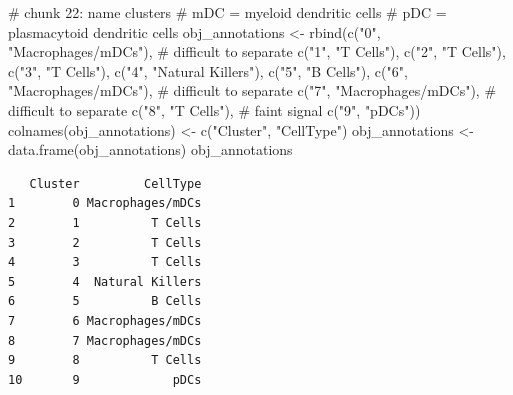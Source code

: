 \documentclass[
  letterpaper,
  DIV=11,
  numbers=noendperiod]{scrartcl}
\newenvironment{Shaded}{\begin{snugshade}}{\end{snugshade}}
\newcommand{\CommentTok}[1]{\textcolor[rgb]{0.37,0.37,0.37}{#1}}
\newcommand{\FunctionTok}[1]{\textcolor[rgb]{0.28,0.35,0.67}{#1}}
\newcommand{\NormalTok}[1]{\textcolor[rgb]{0.00,0.23,0.31}{#1}}
\newcommand{\OtherTok}[1]{\textcolor[rgb]{0.00,0.23,0.31}{#1}}
\newcommand{\StringTok}[1]{\textcolor[rgb]{0.13,0.47,0.30}{#1}}
\begin{document}
\begin{Shaded}
\begin{Highlighting}[]
\CommentTok{\# chunk 22: name clusters }
\CommentTok{\# mDC = myeloid dendritic cells}
\CommentTok{\# pDC = plasmacytoid dendritic cells}
\NormalTok{obj\_annotations }\OtherTok{\textless{}{-}} \FunctionTok{rbind}\NormalTok{(}\FunctionTok{c}\NormalTok{(}\StringTok{"0"}\NormalTok{, }\StringTok{"Macrophages/mDCs"}\NormalTok{), }\CommentTok{\# difficult to separate}
                         \FunctionTok{c}\NormalTok{(}\StringTok{"1"}\NormalTok{, }\StringTok{"T Cells"}\NormalTok{),}
                         \FunctionTok{c}\NormalTok{(}\StringTok{"2"}\NormalTok{, }\StringTok{"T Cells"}\NormalTok{),}
                         \FunctionTok{c}\NormalTok{(}\StringTok{"3"}\NormalTok{, }\StringTok{"T Cells"}\NormalTok{),}
                         \FunctionTok{c}\NormalTok{(}\StringTok{"4"}\NormalTok{, }\StringTok{"Natural Killers"}\NormalTok{),}
                         \FunctionTok{c}\NormalTok{(}\StringTok{"5"}\NormalTok{, }\StringTok{"B Cells"}\NormalTok{),}
                         \FunctionTok{c}\NormalTok{(}\StringTok{"6"}\NormalTok{, }\StringTok{"Macrophages/mDCs"}\NormalTok{), }\CommentTok{\# difficult to separate}
                         \FunctionTok{c}\NormalTok{(}\StringTok{"7"}\NormalTok{, }\StringTok{"Macrophages/mDCs"}\NormalTok{), }\CommentTok{\# difficult to separate}
                         \FunctionTok{c}\NormalTok{(}\StringTok{"8"}\NormalTok{, }\StringTok{"T Cells"}\NormalTok{), }\CommentTok{\# faint signal}
                         \FunctionTok{c}\NormalTok{(}\StringTok{"9"}\NormalTok{, }\StringTok{"pDCs"}\NormalTok{))}
\FunctionTok{colnames}\NormalTok{(obj\_annotations) }\OtherTok{\textless{}{-}} \FunctionTok{c}\NormalTok{(}\StringTok{"Cluster"}\NormalTok{, }\StringTok{"CellType"}\NormalTok{)}
\NormalTok{obj\_annotations }\OtherTok{\textless{}{-}} \FunctionTok{data.frame}\NormalTok{(obj\_annotations)}
\NormalTok{obj\_annotations}
\end{Highlighting}
\end{Shaded}

\begin{verbatim}
   Cluster         CellType
1        0 Macrophages/mDCs
2        1          T Cells
3        2          T Cells
4        3          T Cells
5        4  Natural Killers
6        5          B Cells
7        6 Macrophages/mDCs
8        7 Macrophages/mDCs
9        8          T Cells
10       9             pDCs
\end{verbatim}
\end{document}
